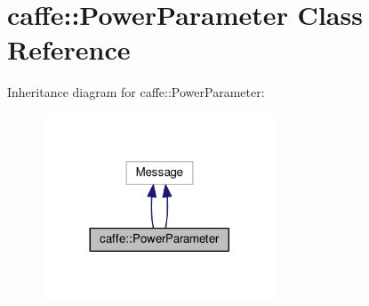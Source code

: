 \hypertarget{classcaffe_1_1_power_parameter}{}\section{caffe\+:\+:Power\+Parameter Class Reference}
\label{classcaffe_1_1_power_parameter}


Inheritance diagram for caffe\+:\+:Power\+Parameter\+:
\nopagebreak
\begin{figure}[H]
\begin{center}
\leavevmode
\includegraphics[width=197pt]{classcaffe_1_1_power_parameter__inherit__graph}
\end{center}
\end{figure}
